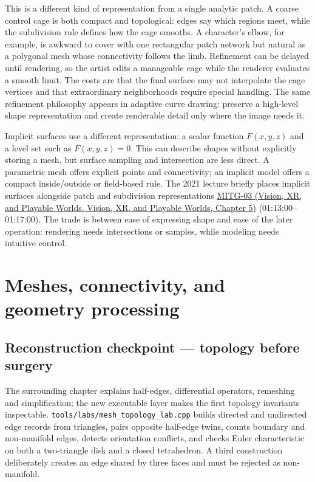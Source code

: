 This is a different kind of representation from a single analytic patch. A coarse control cage is both compact and topological: edges say which regions meet, while the subdivision rule defines how the cage smooths. A character's elbow, for example, is awkward to cover with one rectangular patch network but natural as a polygonal mesh whose connectivity follows the limb. Refinement can be delayed until rendering, so the artist edits a manageable cage while the renderer evaluates a smooth limit. The costs are that the final surface may not interpolate the cage vertices and that extraordinary neighborhoods require special handling. The same refinement philosophy appears in adaptive curve drawing: preserve a high-level shape representation and create renderable detail only where the image needs it.

Implicit surfaces use a different representation: a scalar function \(F(x,y,z)\) and a level set such as \(F(x,y,z)=0\). This can describe shapes without explicitly storing a mesh, but surface sampling and intersection are less direct. A parametric mesh offers explicit points and connectivity; an implicit model offers a compact inside/outside or field-based rule. The 2021 lecture briefly places implicit surfaces alongside patch and subdivision representations \href{../07-Vision-XR-and-Playable-Worlds/main.pdf\#nameddest=04-visual-computing-ii-ch036-mitg-03---curves-and-surfaces}{MITG-03 (Vision, XR, and Playable Worlds, Vision, XR, and Playable Worlds, Chapter 5)} (01:13:00--01:17:00). The trade is between ease of expressing shape and ease of the later operation: rendering needs intersections or samples, while modeling needs intuitive control.

\section{Meshes, connectivity, and geometry processing}\label{03-visual-computing-i-ch002-meshes-connectivity-and-geometry-processing}

\subsection{Reconstruction checkpoint --- topology before surgery}\label{03-visual-computing-i-ch002-reconstruction-checkpoint-topology-before-surgery}

The surrounding chapter explains half-edges, differential operators, remeshing and simplification; the new executable layer makes the first topology invariants inspectable. \texttt{tools/labs/mesh\_topology\_lab.cpp} builds directed and undirected edge records from triangles, pairs opposite half-edge twins, counts boundary and non-manifold edges, detects orientation conflicts, and checks Euler characteristic on both a two-triangle disk and a closed tetrahedron. A third construction deliberately creates an edge shared by three faces and must be rejected as non-manifold.

